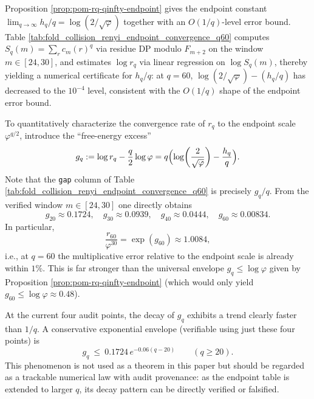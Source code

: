 \begin{remark}[Endpoint convergence rate (reproducible): \texorpdfstring{$h_q/q\to\log(2/\sqrt{\varphi})$}{hq/q->log(2/sqrt(phi))} for \texorpdfstring{$q\le 60$}{q<=60}]\label{rem:pom-renyi-endpoint-q60}
Proposition \ref{prop:pom-rq-qinfty-endpoint} gives the endpoint constant
\(
\lim_{q\to\infty}h_q/q=\log(2/\sqrt{\varphi})
\)
together with an \(O(1/q)\)-level error bound.
Table \ref{tab:fold_collision_renyi_endpoint_convergence_q60} computes \(S_q(m)=\sum_r c_m(r)^q\) via residue DP modulo \(F_{m+2}\) on the window \(m\in[24,30]\), and estimates \(\log r_q\) via linear regression on \(\log S_q(m)\), thereby yielding a numerical certificate for \(h_q/q\):
at \(q=60\), \(\log(2/\sqrt{\varphi})-(h_q/q)\) has decreased to the \(10^{-4}\) level, consistent with the \(O(1/q)\) shape of the endpoint error bound.
\end{remark}


\begin{remark}\label{rem:pom-free-energy-excess-gq}
To quantitatively characterize the convergence rate of \(r_q\) to the endpoint scale \(\varphi^{q/2}\), introduce the ``free-energy excess''
\[
g_q:=\log r_q-\frac{q}{2}\log\varphi
= q\Bigl(\log\!\left(\frac{2}{\sqrt{\varphi}}\right)-\frac{h_q}{q}\Bigr).
\]
Note that the \texttt{gap} column of Table \ref{tab:fold_collision_renyi_endpoint_convergence_q60} is precisely \(g_q/q\).
From the verified window \(m\in[24,30]\) one directly obtains
\[
g_{20}\approx 0.1724,\quad g_{30}\approx 0.0939,\quad g_{40}\approx 0.0444,\quad g_{60}\approx 0.00834.
\]
In particular,
\[
\frac{r_{60}}{\varphi^{30}}=\exp(g_{60})\approx 1.0084,
\]
i.e., at \(q=60\) the multiplicative error relative to the endpoint scale is already within \(1\%\).
This is far stronger than the universal envelope \(g_q\le \log\varphi\) given by Proposition \ref{prop:pom-rq-qinfty-endpoint} (which would only yield \(g_{60}\le\log\varphi\approx 0.48\)).
\par
At the current four audit points, the decay of \(g_q\) exhibits a trend clearly faster than \(1/q\).
A conservative exponential envelope (verifiable using just these four points) is
\[
g_q\ \le\ 0.1724\,e^{-0.06(q-20)}\qquad(q\ge 20).
\]
This phenomenon is not used as a theorem in this paper but should be regarded as a trackable numerical law with audit provenance: as the endpoint table is extended to larger \(q\), its decay pattern can be directly verified or falsified.
\end{remark}

